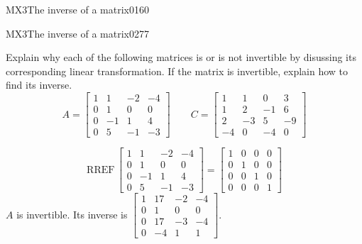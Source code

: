 \begin{exercise}{MX3}{The inverse of a matrix}{0160}
\begin{exerciseAnswer}
 \end{exerciseAnswer}
 \end{exercise}


\newpage




\begin{exercise}{MX3}{The inverse of a matrix}{0277} 
\begin{exerciseStatement} 

 Explain why each of the following matrices is or is not invertible by disussing its corresponding linear transformation. If the matrix is invertible, explain how to find its inverse. \[
\hspace{2em}
A = \left[\begin{array}{cccc}
1 & 1 & -2 & -4 \\
0 & 1 & 0 & 0 \\
0 & -1 & 1 & 4 \\
0 & 5 & -1 & -3
\end{array}\right]
\hspace{2em}
C = \left[\begin{array}{cccc}
1 & 1 & 0 & 3 \\
1 & 2 & -1 & 6 \\
2 & -3 & 5 & -9 \\
-4 & 0 & -4 & 0
\end{array}\right]
\hspace{2em}
        \] 

 \end{exerciseStatement}
 \begin{exerciseAnswer} 

 \[\mathrm{RREF}\,\left[\begin{array}{cccc}
1 & 1 & -2 & -4 \\
0 & 1 & 0 & 0 \\
0 & -1 & 1 & 4 \\
0 & 5 & -1 & -3
\end{array}\right]=\left[\begin{array}{cccc}
1 & 0 & 0 & 0 \\
0 & 1 & 0 & 0 \\
0 & 0 & 1 & 0 \\
0 & 0 & 0 & 1
\end{array}\right]\] \(A\) is invertible. Its inverse is \(\left[\begin{array}{cccc}
1 & 17 & -2 & -4 \\
0 & 1 & 0 & 0 \\
0 & 17 & -3 & -4 \\
0 & -4 & 1 & 1
\end{array}\right]\). 


\end{exerciseAnswer}
\end{exercise}
